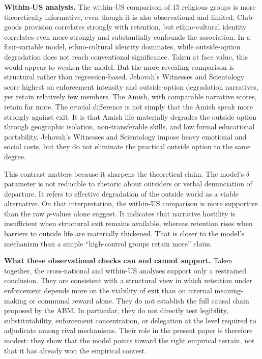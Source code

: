 \documentclass[12pt]{article}
\begin{document}
\noindent\textbf{Within-US analysis.}
The within-US comparison of 15 religious groups is more theoretically informative, even though it is also observational and limited. Club-goods provision correlates strongly with retention, but ethno-cultural identity correlates even more strongly and substantially confounds the association. In a four-variable model, ethno-cultural identity dominates, while outside-option degradation does not reach conventional significance. Taken at face value, this would appear to weaken the model. But the more revealing comparison is structural rather than regression-based. Jehovah's Witnesses and Scientology score highest on enforcement intensity and outside-option degradation narratives, yet retain relatively few members. The Amish, with comparable narrative scores, retain far more. The crucial difference is not simply that the Amish speak more strongly against exit. It is that Amish life materially degrades the outside option through geographic isolation, non-transferable skills, and low formal educational portability. Jehovah's Witnesses and Scientology impose heavy emotional and social costs, but they do not eliminate the practical outside option to the same degree.

This contrast matters because it sharpens the theoretical claim. The model's $\delta$ parameter is not reducible to rhetoric about outsiders or verbal denunciation of departure. It refers to effective degradation of the outside world as a viable alternative. On that interpretation, the within-US comparison is more supportive than the raw $p$-values alone suggest. It indicates that narrative hostility is insufficient when structural exit remains available, whereas retention rises when barriers to outside life are materially thickened. That is closer to the model's mechanism than a simple ``high-control groups retain more'' claim.

\noindent\textbf{What these observational checks can and cannot support.}
Taken together, the cross-national and within-US analyses support only a restrained conclusion. They are consistent with a structural view in which retention under enforcement depends more on the viability of exit than on internal meaning-making or communal reward alone. They do not establish the full causal chain proposed by the ABM. In particular, they do not directly test legibility, substitutability, enforcement concentration, or delegation at the level required to adjudicate among rival mechanisms. Their role in the present paper is therefore modest: they show that the model points toward the right empirical terrain, not that it has already won the empirical contest.
\end{document}
